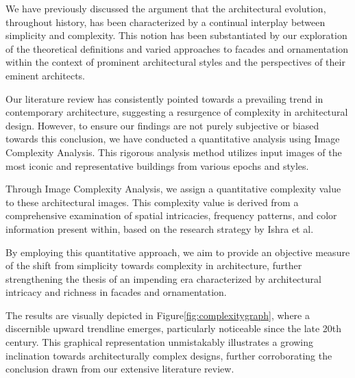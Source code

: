 %    

We have previously discussed the argument that the architectural evolution, throughout history, has been characterized by a continual interplay between simplicity and complexity.
This notion has been substantiated by our exploration of the theoretical definitions and varied approaches to facades and ornamentation within the context of prominent architectural styles and the perspectives of their eminent architects.

Our literature review has consistently pointed towards a prevailing trend in contemporary architecture, suggesting a resurgence of complexity in architectural design.
However, to ensure our findings are not purely subjective or biased towards this conclusion, we have conducted a quantitative analysis using Image Complexity Analysis.
This rigorous analysis method utilizes input images of the most iconic and representative buildings from various epochs and styles.

Through Image Complexity Analysis, we assign a quantitative complexity value to these architectural images.
This complexity value is derived from a comprehensive examination of spatial intricacies, frequency patterns, and color information present within, based on the research strategy by Ishra et al\cite{Ishrat2020}.

By employing this quantitative approach, we aim to provide an objective measure of the shift from simplicity towards complexity in architecture, further strengthening the thesis of an impending era characterized by architectural intricacy and richness in facades and ornamentation.

The results are visually depicted in Figure\ref{fig:complexitygraph}, where a discernible upward trendline emerges, particularly noticeable since the late 20th century.
This graphical representation unmistakably illustrates a growing inclination towards architecturally complex designs, further corroborating the conclusion drawn from our extensive literature review.

